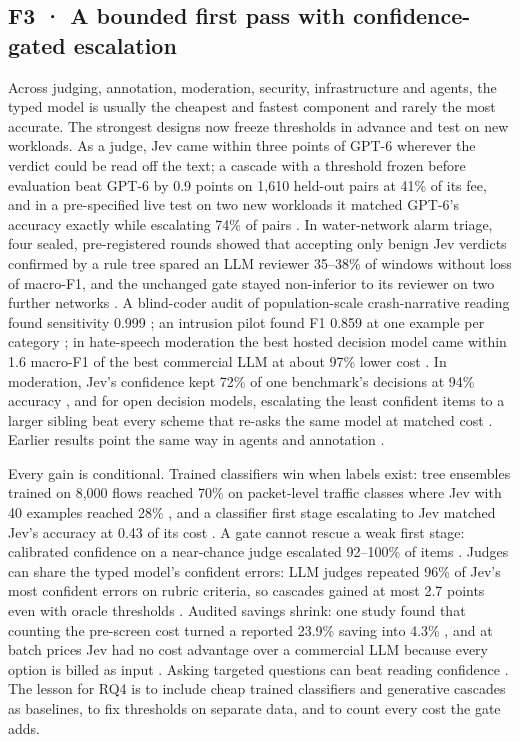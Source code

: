 \subsection{F3 · A bounded first pass with confidence-gated escalation}

Across judging, annotation, moderation, security, infrastructure and agents, the typed model is usually the cheapest and fastest component and rarely the most accurate. The strongest designs now freeze thresholds in advance and test on new workloads. As a judge, Jev came within three points of GPT-6 wherever the verdict could be read off the text; a cascade with a threshold frozen before evaluation beat GPT-6 by 0.9 points on 1,610 held-out pairs at 41\% of its fee, and in a pre-specified live test on two new workloads it matched GPT-6's accuracy exactly while escalating 74\% of pairs \citep{arxiv2609_26550}. In water-network alarm triage, four sealed, pre-registered rounds showed that accepting only benign Jev verdicts confirmed by a rule tree spared an LLM reviewer 35–38\% of windows without loss of macro-F1, and the unchanged gate stayed non-inferior to its reviewer on two further networks \citep{arxiv2610_02048}. A blind-coder audit of population-scale crash-narrative reading found sensitivity 0.999 \citep{arxiv2610_00213}; an intrusion pilot found F1 0.859 at one example per category \citep{arxiv2610_01079}; in hate-speech moderation the best hosted decision model came within 1.6 macro-F1 of the best commercial LLM at about 97\% lower cost \citep{arxiv2610_03324}. In moderation, Jev's confidence kept 72\% of one benchmark's decisions at 94\% accuracy \citep{arxiv2610_07953}, and for open decision models, escalating the least confident items to a larger sibling beat every scheme that re-asks the same model at matched cost \citep{arxiv2610_07716}. Earlier results point the same way in agents and annotation \citep{arxiv2609_26532,arxiv2609_24574}.

Every gain is conditional. Trained classifiers win when labels exist: tree ensembles trained on 8,000 flows reached 70\% on packet-level traffic classes where Jev with 40 examples reached 28\% \citep{arxiv2610_00376}, and a classifier first stage escalating to Jev matched Jev's accuracy at 0.43 of its cost \citep{arxiv2610_00346}. A gate cannot rescue a weak first stage: calibrated confidence on a near-chance judge escalated 92–100\% of items \citep{arxiv2610_07177}. Judges can share the typed model's confident errors: LLM judges repeated 96\% of Jev's most confident errors on rubric criteria, so cascades gained at most 2.7 points even with oracle thresholds \citep{arxiv2609_29769}. Audited savings shrink: one study found that counting the pre-screen cost turned a reported 23.9\% saving into 4.3\% \citep{arxiv2610_02267}, and at batch prices Jev had no cost advantage over a commercial LLM because every option is billed as input \citep{arxiv2610_06625}. Asking targeted questions can beat reading confidence \citep{arxiv2610_01006}. The lesson for RQ4 is to include cheap trained classifiers and generative cascades as baselines, to fix thresholds on separate data, and to count every cost the gate adds.

